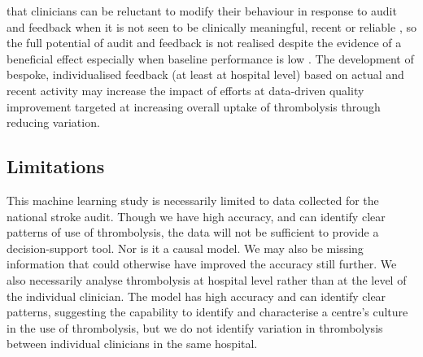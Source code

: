 that clinicians can be reluctant to modify their behaviour in response to audit and feedback when it is not seen to be clinically meaningful, recent or reliable \cite{bekker_give_2022}, so the full potential of audit and feedback is not realised \cite{foy_revitalising_2020} despite the evidence of a beneficial effect especially when baseline performance is low \cite{ivers_audit_2012}. The development of bespoke, individualised feedback (at least at hospital level) based on actual and recent activity may increase the impact of efforts at data-driven quality improvement targeted at increasing overall uptake of thrombolysis through reducing variation.



\subsection{Limitations}

This machine learning study is necessarily limited to data collected for the national stroke audit. Though we have high accuracy, and can identify clear patterns of use of thrombolysis, the data will not be sufficient to provide a decision-support tool. Nor is it a causal model. We may also be missing information that could otherwise have improved the accuracy still further. We also necessarily analyse thrombolysis at hospital level rather than at the level of the individual clinician. The model has high accuracy and can identify clear patterns, suggesting the capability to identify and characterise a centre's culture in the use of thrombolysis, but we do not identify variation in thrombolysis between individual clinicians in the same hospital.

